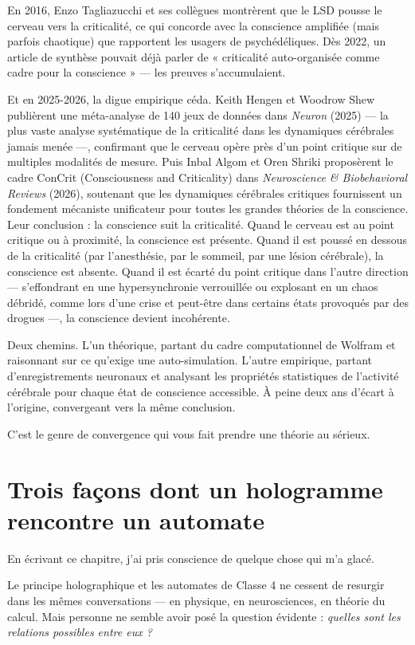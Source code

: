 \documentclass[11pt, twoside, openright]{book}
\begin{document}
En 2016, Enzo Tagliazucchi et ses collègues montrèrent que le LSD pousse le cerveau vers la criticalité, ce qui concorde avec la conscience amplifiée (mais parfois chaotique) que rapportent les usagers de psychédéliques. Dès 2022, un article de synthèse pouvait déjà parler de « criticalité auto-organisée comme cadre pour la conscience » --- les preuves s'accumulaient.

Et en 2025-2026, la digue empirique céda. Keith Hengen et Woodrow Shew publièrent une méta-analyse de 140 jeux de données dans \textit{Neuron} (2025) --- la plus vaste analyse systématique de la criticalité dans les dynamiques cérébrales jamais menée ---, confirmant que le cerveau opère près d'un point critique sur de multiples modalités de mesure. Puis Inbal Algom et Oren Shriki proposèrent le cadre ConCrit (Consciousness and Criticality) dans \textit{Neuroscience \& Biobehavioral Reviews} (2026), soutenant que les dynamiques cérébrales critiques fournissent un fondement mécaniste unificateur pour toutes les grandes théories de la conscience. Leur conclusion : la conscience suit la criticalité. Quand le cerveau est au point critique ou à proximité, la conscience est présente. Quand il est poussé en dessous de la criticalité (par l'anesthésie, par le sommeil, par une lésion cérébrale), la conscience est absente. Quand il est écarté du point critique dans l'autre direction --- s'effondrant en une hypersynchronie verrouillée ou explosant en un chaos débridé, comme lors d'une crise et peut-être dans certains états provoqués par des drogues ---, la conscience devient incohérente.

Deux chemins. L'un théorique, partant du cadre computationnel de Wolfram et raisonnant sur ce qu'exige une auto-simulation. L'autre empirique, partant d'enregistrements neuronaux et analysant les propriétés statistiques de l'activité cérébrale pour chaque état de conscience accessible. À peine deux ans d'écart à l'origine, convergeant vers la même conclusion.

C'est le genre de convergence qui vous fait prendre une théorie au sérieux.

\section*{Trois façons dont un hologramme rencontre un automate}

En écrivant ce chapitre, j'ai pris conscience de quelque chose qui m'a glacé.

Le principe holographique et les automates de Classe 4 ne cessent de resurgir dans les mêmes conversations --- en physique, en neurosciences, en théorie du calcul. Mais personne ne semble avoir posé la question évidente : \textit{quelles sont les relations possibles entre eux ?}
\end{document}
